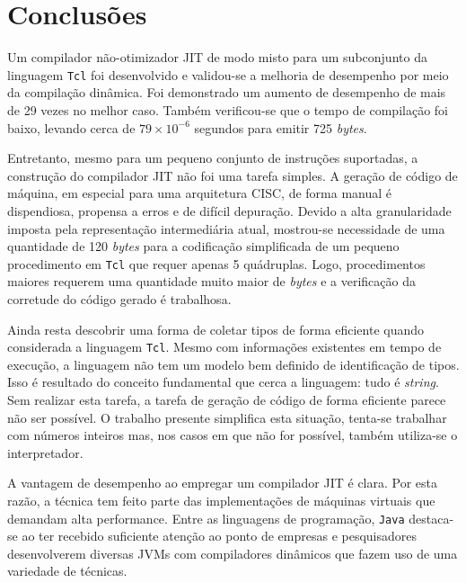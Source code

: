 \chapter{Conclusões}
\label{conclusao}


Um compilador não-otimizador JIT de modo misto para um subconjunto da
linguagem \texttt{Tcl} foi
desenvolvido e validou-se a melhoria de desempenho por meio da
compilação dinâmica. Foi demonstrado um aumento de desempenho de mais
de 29 vezes no melhor caso. Também verificou-se que o tempo
de compilação foi baixo, levando cerca de $79 \times 10^{-6}$
segundos para emitir 725 \textit{bytes}.

Entretanto, mesmo para um pequeno conjunto de
instruções suportadas, a construção do compilador JIT não
foi uma tarefa simples. A geração de código de máquina, em especial
para uma arquitetura CISC, de forma manual é dispendiosa, propensa a
erros e de difícil depuração. Devido a alta
granularidade imposta pela representação intermediária atual,
mostrou-se necessidade de uma quantidade de 120 \textit{bytes}
para a codificação simplificada de um pequeno procedimento em
\texttt{Tcl} que requer apenas 5 quádruplas.
Logo, procedimentos maiores requerem uma quantidade
muito maior de \textit{bytes} e a
verificação da corretude do código gerado é trabalhosa.

Ainda resta descobrir uma forma de coletar tipos de forma eficiente
quando considerada a linguagem \texttt{Tcl}. Mesmo com informações
existentes em tempo de execução, a linguagem não tem um modelo bem
definido de identificação de tipos. Isso é resultado do conceito
fundamental que cerca a linguagem: tudo é \textit{string}. Sem
realizar esta tarefa, a tarefa de
geração de código de forma eficiente parece não ser possível.
O trabalho presente simplifica esta situação, tenta-se trabalhar com
números inteiros mas, nos casos em que não for possível, também
utiliza-se o interpretador.


A vantagem de desempenho ao empregar um compilador JIT é
clara. Por esta razão, a técnica tem feito parte das implementações de
máquinas virtuais que demandam alta performance. Entre as linguagens de
programação, \texttt{Java} destaca-se
ao ter recebido suficiente atenção ao ponto de empresas e
pesquisadores desenvolverem diversas JVMs com compiladores
dinâmicos que fazem uso de uma variedade de técnicas.

